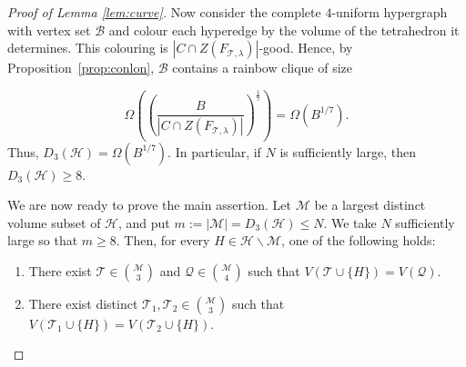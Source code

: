 \documentclass[a4paper,oneside,10pt]{amsart}
\begin{document}
\begin{proof}[Proof of Lemma \ref{lem:curve}]
Now consider the complete $4$-uniform hypergraph with vertex set $\mathcal{B}$ and colour each hyperedge by the volume of the tetrahedron it determines. This colouring is $|C \cap Z(F_{\mathcal{T}, \lambda})|$-good. Hence, by Proposition~\ref{prop:conlon}, $\mathcal{B}$ contains a rainbow clique of size

$$
\Omega \left(\left(\frac{B}{|C \cap Z (F_{\mathcal{T}, \lambda})|}\right)^\frac{1}{7}\right) = \Omega (B^{1/7}).
$$
Thus, $D_3 (\mathcal{H}) = \Omega (B^{1/7})$.
In particular, if $N$ is sufficiently large, then $D_3 (\mathcal{H}) \geq 8$.

We are now ready to prove the main assertion.
Let $\mathcal{M}$ be a largest distinct volume subset of $\mathcal{H}$, and put $m := |\mathcal{M}| = D_3 (\mathcal{H}) \leq N$.
We take $N$ sufficiently large so that $m \geq 8$.
Then, for every $H \in \mathcal{H} \backslash \mathcal{M}$, one of the following holds:

\begin{enumerate}[label={Case(\Roman*):}]
    \item There exist $\mathcal{T} \in \binom{\mathcal{M}}{3}$ and $\mathcal{Q} \in \binom{\mathcal{M}}{4}$ such that $V(\mathcal{T} \cup \{ H \} ) = V(\mathcal{Q})$. 
    \item There exist distinct $\mathcal{T}_1 , \mathcal{T}_2 \in \binom{\mathcal{M}}{3}$ such that $V(\mathcal{T}_1  \cup \{ H \} ) = V(\mathcal{T}_2 \cup \{ H \})$.
\end{enumerate}


\end{proof}
\end{document}
